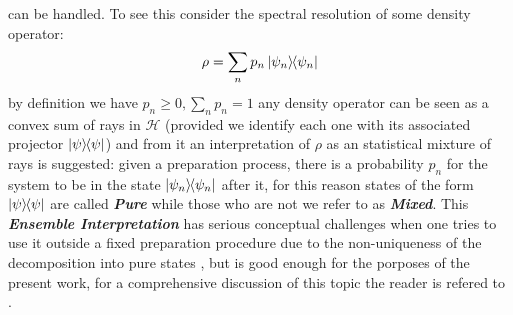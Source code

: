 can be handled. To see this consider the spectral resolution of some density operator:
\begin{equation}
  \rho = \sum_{n}p_{n}\ketbra{\psi_{n}}
\end{equation}
by definition we have $p_{n}\geq 0, \sum_{n}p_{n}=1$  any density operator can be seen as a convex sum of rays in $\mathcal{H}$ (provided we
identify each one with its associated projector $\ketbra{\psi}$) and from it an  interpretation of $\rho$ as an statistical mixture of rays is
suggested: given a preparation process, there is a probability $p_{n}$ for the system to be in the state $\ketbra{\psi_{n}}$ after it, for this
reason states of the form $\ketbra{\psi}$ are called \textbf{\textit{Pure}} while those who are not we refer to as \textbf{\textit{Mixed}}.
This \textbf{\textit{Ensemble Interpretation}} has serious conceptual challenges when one tries to use it outside a
fixed preparation procedure due to the non-uniqueness of the decomposition into pure states \cite{nielsen_quantum_2010},
but is good enough for the porposes of the present work, for a comprehensive discussion of this
topic the reader is refered to \cite{schlosshauer_decoherence_2007}.

